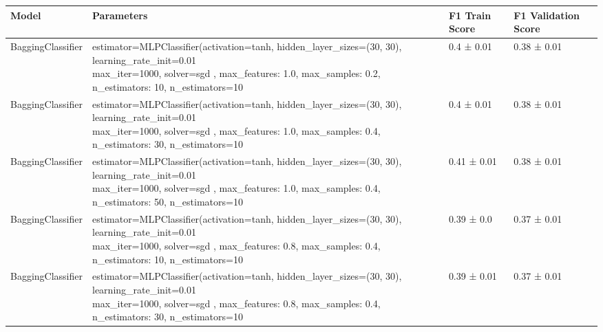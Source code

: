 \begin{tabular}{llll}
    \toprule
    Model             & Parameters                                                                                                                                                                                       & F1 Train Score & F1 Validation Score \\
    \midrule
    BaggingClassifier & \makecell[l]{estimator=MLPClassifier(activation=tanh,                                          hidden\_layer\_sizes=(30, 30),                                          learning\_rate\_init=0.01                                        \\                                          max\_iter=1000, solver=sgd , max\_features: 1.0, max\_samples: 0.2, n\_estimators: 10, n\_estimators=10} & 0.4 ± 0.01     & 0.38 ± 0.01         \\
    \addlinespace[15pt]
    BaggingClassifier & \makecell[l]{estimator=MLPClassifier(activation=tanh,                                          hidden\_layer\_sizes=(30, 30),                                          learning\_rate\_init=0.01                                        \\                                          max\_iter=1000, solver=sgd , max\_features: 1.0, max\_samples: 0.4, n\_estimators: 30, n\_estimators=10} & 0.4 ± 0.01     & 0.38 ± 0.01         \\
    \addlinespace[15pt]
    BaggingClassifier & \makecell[l]{estimator=MLPClassifier(activation=tanh,                                          hidden\_layer\_sizes=(30, 30),                                          learning\_rate\_init=0.01                                        \\                                         max\_iter=1000, solver=sgd , max\_features: 1.0, max\_samples: 0.4, n\_estimators: 50, n\_estimators=10} & 0.41 ± 0.01    & 0.38 ± 0.01         \\
    \addlinespace[15pt]
    BaggingClassifier & \makecell[l]{estimator=MLPClassifier(activation=tanh,                                          hidden\_layer\_sizes=(30, 30),                                          learning\_rate\_init=0.01                                        \\                                          max\_iter=1000, solver=sgd , max\_features: 0.8, max\_samples: 0.4, n\_estimators: 10, n\_estimators=10} & 0.39 ± 0.0     & 0.37 ± 0.01         \\
    \addlinespace[15pt]
    BaggingClassifier & \makecell[l]{estimator=MLPClassifier(activation=tanh,                                          hidden\_layer\_sizes=(30, 30),                                          learning\_rate\_init=0.01                                        \\                                         max\_iter=1000, solver=sgd , max\_features: 0.8, max\_samples: 0.4, n\_estimators: 30, n\_estimators=10} & 0.39 ± 0.01    & 0.37 ± 0.01         \\

\end{tabular}
